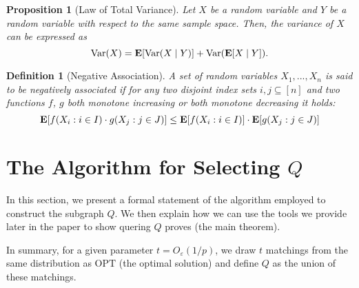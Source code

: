 \documentclass[letterpaper,11pt]{article}
\renewcommand{\epsilon}{\varepsilon}
\DeclareMathOperator{\E}{\ensuremath{\normalfont \textbf{E}}}
\newcommand{\opt}[0]{\text{OPT}}
\DeclareMathOperator{\var}{Var}
\renewcommand{\epsilon}[0]{\ensuremath{\varepsilon}}
\newtheorem{proposition}[lemma]{Proposition}
\newtheorem{definition}[lemma]{Definition}
\begin{document}
\begin{proposition}[Law of Total Variance]\label{prop:lawof}
Let $X$ be a random variable and $Y$ be a random variable with respect to the same sample space. Then, the variance of $X$ can be expressed as
\begin{equation*}
\var(X) = \E[\var(X\mid Y)] + \var(\E[X\mid Y]).
\end{equation*}
\end{proposition}

\begin{definition}[Negative Association]\label{def:negativeAssociation}
A set of random variables $X_1, ..., X_n$ is said to be negatively associated if for any two disjoint index sets $i, j \subseteq [n]$ and two functions $f$, $g$ both monotone increasing or both monotone decreasing it holds:
$$
\E[f(X_i: i \in I) \cdot g(X_j: j \in J)] \leq \E[f(X_i: i \in I)] \cdot \E[g(X_j: j \in J)]
$$
\end{definition}







 \section{The Algorithm for Selecting $Q$}
In this section, we present a formal statement of the algorithm employed to construct the subgraph $Q$. We then explain how we can use the tools we  provide later in the paper to show  quering $Q$ proves  (the main theorem). 

In summary, for a given parameter $t = O_{\epsilon}(1/p)$, we draw $t$ matchings from the same distribution as $\opt$ (the optimal solution) and define $Q$ as the union of these matchings.
\end{document}
